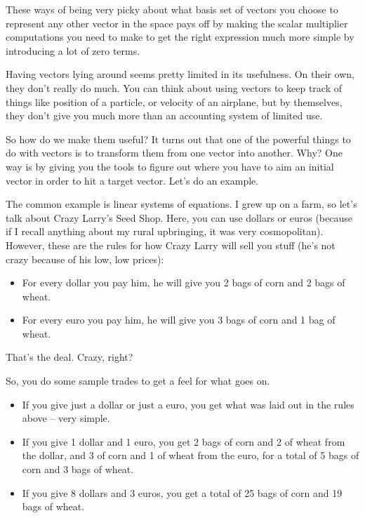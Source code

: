 \documentclass[
]{book}
\providecommand{\tightlist}{%
  \setlength{\itemsep}{0pt}\setlength{\parskip}{0pt}}
\begin{document}
These ways of being very picky about what basis set of vectors you choose to represent any other vector in the space pays off by making the scalar multiplier computations you need to make to get the right expression much more simple by introducing a lot of zero terms.

Having vectors lying around seems pretty limited in its usefulness. On their own, they don't really do much. You can think about using vectors to keep track of things like position of a particle, or velocity of an airplane, but by themselves, they don't give you much more than an accounting system of limited use.

So how do we make them useful? It turns out that one of the powerful things to do with vectors is to transform them from one vector into another. Why? One way is by giving you the tools to figure out where you have to aim an initial vector in order to hit a target vector. Let's do an example.

The common example is linear systems of equations. I grew up on a farm, so let's talk about Crazy Larry's Seed Shop. Here, you can use dollars or euros (because if I recall anything about my rural upbringing, it was very cosmopolitan). However, these are the rules for how Crazy Larry will sell you stuff (he's not crazy because of his low, low prices):

\begin{itemize}
\tightlist
\item
  For every dollar you pay him, he will give you 2 bags of corn and 2 bags of wheat.
\item
  For every euro you pay him, he will give you 3 bags of corn and 1 bag of wheat.
\end{itemize}

That's the deal. Crazy, right?

So, you do some sample trades to get a feel for what goes on.

\begin{itemize}
\tightlist
\item
  If you give just a dollar or just a euro, you get what was laid out in the rules above -- very simple.
\item
  If you give 1 dollar and 1 euro, you get 2 bags of corn and 2 of wheat from the dollar, and 3 of corn and 1 of wheat from the euro, for a total of 5 bags of corn and 3 bags of wheat.
\item
  If you give 8 dollars and 3 euros, you get a total of 25 bags of corn and 19 bags of wheat.
\end{itemize}
\end{document}
